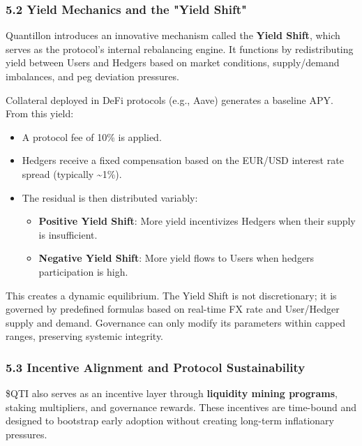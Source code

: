 \hypertarget{yield-mechanics-and-the-yield-shift}{%
\subsubsection{5.2 Yield Mechanics and the "Yield
Shift"}\label{yield-mechanics-and-the-yield-shift}}

Quantillon introduces an innovative mechanism called the \textbf{Yield
Shift}, which serves as the protocol's internal rebalancing engine. It
functions by redistributing yield between Users and Hedgers based on
market conditions, supply/demand imbalances, and peg deviation
pressures.

Collateral deployed in DeFi protocols (e.g., Aave) generates a baseline
APY. From this yield:

\begin{itemize}
\item
  A protocol fee of 10\% is applied.
\item
  Hedgers receive a fixed compensation based on the EUR/USD interest
  rate spread (typically \textasciitilde1\%).
\item
  The residual is then distributed variably:

  \begin{itemize}
  \item
    \textbf{Positive Yield Shift}: More yield incentivizes Hedgers when
    their supply is insufficient.
  \item
    \textbf{Negative Yield Shift}: More yield flows to Users when
    hedgers participation is high.
  \end{itemize}
\end{itemize}

This creates a dynamic equilibrium. The Yield Shift is not
discretionary; it is governed by predefined formulas based on real-time
FX rate and User/Hedger supply and demand. Governance can only modify
its parameters within capped ranges, preserving systemic integrity.

\hypertarget{incentive-alignment-and-protocol-sustainability}{%
\subsubsection{5.3 Incentive Alignment and Protocol
Sustainability}\label{incentive-alignment-and-protocol-sustainability}}

\$QTI also serves as an incentive layer through \textbf{liquidity mining
programs}, staking multipliers, and governance rewards. These incentives
are time-bound and designed to bootstrap early adoption without creating
long-term inflationary pressures.

